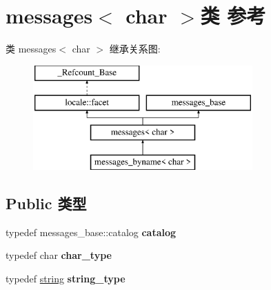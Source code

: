 \hypertarget{classmessages_3_01char_01_4}{}\section{messages$<$ char $>$类 参考}
\label{classmessages_3_01char_01_4}
类 messages$<$ char $>$ 继承关系图\+:\begin{figure}[H]
\begin{center}
\leavevmode
\includegraphics[height=4.000000cm]{classmessages_3_01char_01_4}
\end{center}
\end{figure}
\subsection*{Public 类型}
\begin{DoxyCompactItemize}
\item 
\mbox{\label{classmessages_3_01char_01_4_adff16bbe8d01f1217fe2f32bd5a2d4cb}} 
typedef messages\+\_\+base\+::catalog {\bfseries catalog}
\item 
\mbox{\label{classmessages_3_01char_01_4_a28fa48832fb34d912adac4f8f66edbe0}} 
typedef char {\bfseries char\+\_\+type}
\item 
\mbox{\label{classmessages_3_01char_01_4_ae60132e473e9cdf8f77842e183b4018c}} 
typedef \hyperlink{structstring}{string} {\bfseries string\+\_\+type}
\end{DoxyCompactItemize}
